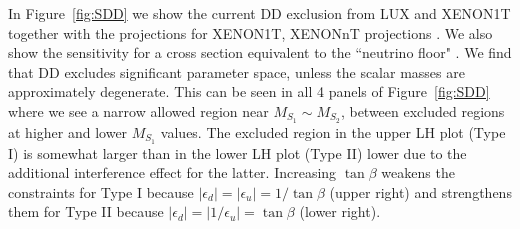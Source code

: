In Figure~\ref{fig:SDD} we show the current DD exclusion from LUX \citep{Akerib:2016vxi} and XENON1T\citep{Aprile:2017iyp} together with the projections for XENON1T, XENONnT projections \citep{Aprile:2015uzo}.  We also show the sensitivity for a cross section equivalent to the ``neutrino floor" \citep{Billard:2013qya}.  We find that DD excludes significant parameter space, unless the scalar masses are approximately degenerate.  This can be seen in all 4 panels of Figure~\ref{fig:SDD} where we see a narrow allowed region near $M_{S_1} \sim M_{S_2}$, between excluded regions at higher and lower $M_{S_1}$ values.  
The excluded region in the upper LH plot (Type I) is somewhat larger than in the lower LH plot (Type II) lower due to the additional interference effect for the latter.
Increasing $\tan\beta$ weakens the constraints for Type I because $|\epsilon_d|=|\epsilon_u|=1/\tan\beta$ (upper right) and strengthens them for Type II because $|\epsilon_d|=|1/\epsilon_u|=\tan\beta$ (lower right).



